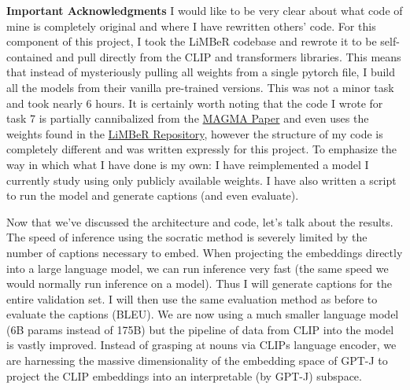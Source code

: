 \documentclass{article}
\begin{document}
\textbf{Important Acknowledgments} I would like to be very clear about what code of mine is completely original and where I have rewritten others' code. For this component of this project, I took the LiMBeR codebase and rewrote it to be self-contained and pull directly from the CLIP and transformers libraries. This means that instead of mysteriously pulling all weights from a single pytorch file, I build all the models from their vanilla pre-trained versions. This was not a minor task and took nearly 6 hours. It is certainly worth noting that the code I wrote for task 7 is partially cannibalized from the \href{https://arxiv.org/abs/2112.05253}{MAGMA Paper} and even uses the weights found in the \href{https://github.com/jmerullo/limber}{LiMBeR Repository}, however the structure of my code is completely different and was written expressly for this project. To emphasize the way in which what I have done is my own: I have reimplemented a model I currently study using only publicly available weights. I have also written a script to run the model and generate captions (and even evaluate).

Now that we've discussed the architecture and code, let's talk about the results. The speed of inference using the socratic method is severely limited by the number of captions necessary to embed. When projecting the embeddings directly into a large language model, we can run inference very fast (the same speed we would normally run inference on a model). Thus I will generate captions for the entire validation set. I will then use the same evaluation method as before to evaluate the captions (BLEU). We are now using a much smaller language model (6B params instead of 175B) but the pipeline of data from CLIP into the model is vastly improved. Instead of grasping at nouns via CLIPs language encoder, we are harnessing the massive dimensionality of the embedding space of GPT-J to project the CLIP embeddings into an interpretable (by GPT-J) subspace.
\end{document}
